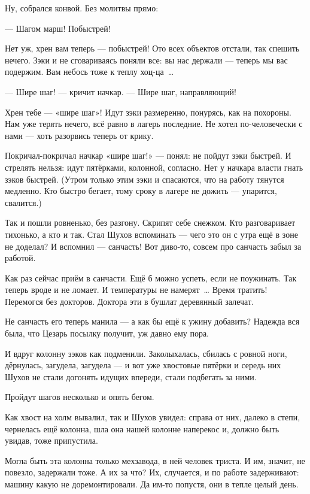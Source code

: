 Ну, собрался конвой. Без молитвы прямо:

--- Шагом марш! Побыстрей!

Нет уж, хрен вам теперь --- побыстрей! Ото всех объектов отстали, так спешить нечего. Зэки и не сговариваясь поняли все: вы нас держали --- теперь мы вас подержим. Вам небось тоже к теплу хоц-ца~\dots{}

--- Шире шаг! --- кричит начкар. --- Шире шаг, направляющий!

Хрен тебе --- «шире шаг»! Идут зэки размеренно, понурясь, как на похороны. Нам уже терять нечего, всё равно в лагерь последние. Не хотел по-человечески с нами --- хоть разорвись теперь от крику.

Покричал-покричал начкар «шире шаг!» --- понял: не пойдут зэки быстрей. И стрелять нельзя: идут пятёрками, колонной, согласно. Нет у начкара власти гнать зэков быстрей. (Утром только этим зэки и спасаются, что на работу тянутся медленно. Кто быстро бегает, тому сроку в лагере не дожить --- упарится, свалится.)

Так и пошли ровненько, без разгону. Скрипят себе снежком. Кто разговаривает тихонько, а кто и так. Стал Шухов вспоминать --- чего это он с утра ещё в зоне не доделал? И вспомнил --- санчасть! Вот диво-то, совсем про санчасть забыл за работой.

Как раз сейчас приём в санчасти. Ещё б можно успеть, если не поужинать. Так теперь вроде и не ломает. И температуры не намерят~\dots{} Время тратить! Перемогся без докторов. Доктора эти в бушлат деревянный залечат.

Не санчасть его теперь манила --- а как бы ещё к ужину добавить? Надежда вся была, что Цезарь посылку получит, уж давно ему пора.

И вдруг колонну зэков как подменили. Заколыхалась, сбилась с ровной ноги, дёрнулась, загудела, загудела --- и вот уже хвостовые пятёрки и середь них Шухов не стали догонять идущих впереди, стали подбегать за ними.

Пройдут шагов несколько и опять бегом.

Как хвост на холм вывалил, так и Шухов увидел: справа от них, далеко в степи, чернелась ещё колонна, шла она нашей колонне наперекос и, должно быть увидав, тоже припустила.

Могла быть эта колонна только мехзавода, в ней человек триста. И им, значит, не повезло, задержали тоже. А их за что? Их, случается, и по работе задерживают: машину какую не доремонтировали. Да им-то попустя, они в тепле целый день.

